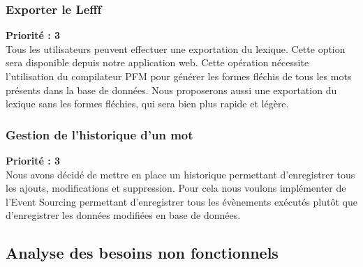 \documentclass[12pt,a4paper]{article}
\begin{document}
 \subsubsection{Exporter le Lefff}
\textbf{Priorité : 3}  \\
Tous les utilisateurs peuvent effectuer une exportation du lexique. Cette option sera disponible depuis notre application web. Cette opération nécessite l'utilisation du compilateur PFM pour générer les formes fléchis de tous les mots présents dans la base de données.
Nous proposerons aussi une exportation du lexique sans les formes fléchies, qui sera bien plus rapide et légère.


\subsubsection{Gestion de l'historique d'un mot}
 \textbf{Priorité : 3} \\
Nous avons décidé de mettre en place un historique permettant d'enregistrer tous les ajouts, modifications et suppression. Pour cela nous voulons implémenter de l'Event Sourcing permettant d'enregistrer tous les évènements exécutés plutôt que d'enregistrer les données modifiées en base de données.
\subsection{Analyse des besoins non fonctionnels}
\smallbreak
\end{document}
